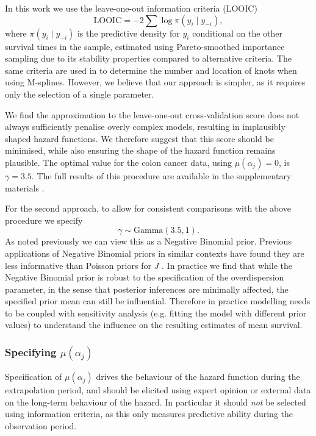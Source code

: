 \documentclass[ba,preprint]{imsart}
\theoremstyle{plain}
\theoremstyle{definition}
\theoremstyle{remark}
\begin{document}
{\color{red}In this work we use the leave-one-out information criteria (LOOIC)
\begin{equation*}
    \text{LOOIC} = -2\sum\log\pi(y_i\mid y_{-i}),
\end{equation*}
where $\pi(y_i\mid y_{-i})$ is the predictive density for $y_i$ conditional on the other survival times in the sample,} estimated using Pareto-smoothed importance sampling \citep{Vehtari2017} due to its stability properties compared to alternative criteria. The same criteria are used in \citet{Jackson2023} to determine the number and location of knots when using M-splines. However, we believe that our approach is simpler, as it requires only the selection of a single parameter.

We find the approximation to the leave-one-out cross-validation score does not always sufficiently penalise overly complex models, resulting in implausibly shaped hazard functions. We therefore suggest that this score should be minimised, while also ensuring the shape of the hazard function remains plausible. The optimal value for the colon cancer data, using $\mu(\alpha_j) = 0$, is $\gamma = 3.5$. The full results of this procedure are available in the supplementary materials \citep[{\color{red}Section 3.1}]{Hardcastle2024supp}.

For the second approach, to allow for consistent comparisons with the above procedure we specify 
\begin{equation*}
    \gamma \sim \text{Gamma}(3.5,1).
\end{equation*}
As noted previously we can view this as a Negative Binomial prior. Previous applications of Negative Binomial priors in similar contexts have found they are less informative than Poisson priors for $J$ \citep{Sharef2010}. In practice we find that while the Negative Binomial prior is robust to the specification of the overdispersion parameter, in the sense that posterior inferences are minimally affected, the specified prior mean can still be influential. {\color{red}Therefore in practice modelling needs to be coupled with sensitivity analysis (e.g. fitting the model with different prior values) to understand the influence on the resulting estimates of mean survival.}

\subsubsection{Specifying $\mu(\alpha_j)$}

Specification of $\mu(\alpha_j)$ drives the behaviour of the hazard function during the extrapolation period, and should be elicited using expert opinion or external data on the long-term behaviour of the hazard. In particular it should \textit{not} be selected using information criteria, as this only measures predictive ability during the observation period. 
\end{document}
